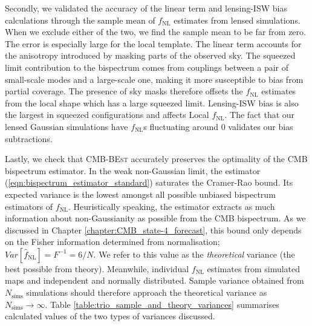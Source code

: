 Secondly, we validated the accuracy of the linear term and lensing-ISW bias calculations through the sample mean of $f_\text{NL}$ estimates from lensed simulations. When we exclude either of the two, we find the sample mean to be far from zero. The error is especially large for the local template. The linear term accounts for the anisotropy introduced by masking parts of the observed sky. The squeezed limit contribution to the bispectrum comes from couplings between a pair of small-scale modes and a large-scale one, making it more susceptible to bias from partial coverage. The presence of sky masks therefore offsets the $f_\text{NL}$ estimates from the local shape which has a large squeezed limit. Lensing-ISW bias is also the largest in squeezed configurations and affects Local $f_\text{NL}$. The fact that our lensed Gaussian simulations have $f_\text{NL}$s fluctuating around $0$ validates our bias subtractions.

Lastly, we check that \textsc{CMB-BEst} accurately preserves the optimality of the CMB bispectrum estimator. In the weak non-Gaussian limit, the estimator (\ref{eqn:bispectrum_estimator_standard}) saturates the Cramer-Rao bound. Its expected variance is the lowest amongst all possible unbiased bispectrum estimators of $f_\text{NL}$. Heuristically speaking, the estimator extracts as much information about non-Gaussianity as possible from the CMB bispectrum. As we discussed in Chapter \ref{chapter:CMB_state-4_forecast}, this bound only depends on the Fisher information determined from normalisation; $Var[\hat{f}_\text{NL}]=F^{-1}=6/N$. We refer to this value as the \textit{theoretical} variance (the best possible from theory). Meanwhile, individual $f_\text{NL}$ estimates from simulated maps and independent and normally distributed. Sample variance obtained from $N_\text{sims}$ simulations should therefore approach the theoretical variance as $N_\text{sims}\rightarrow\infty$. Table \ref{table:trio_sample_and_theory_variances} summarises calculated values of the two types of variances discussed.

